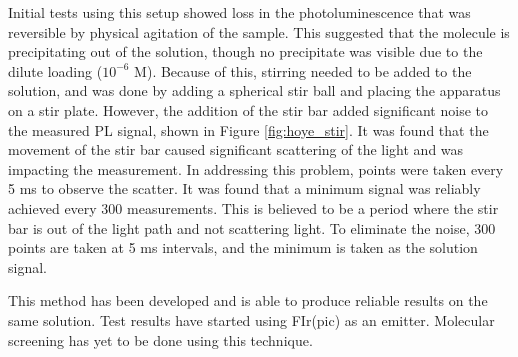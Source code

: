 \documentclass[../thesis.tex]{subfiles}
\begin{document}
Initial tests using this setup showed loss in the photoluminescence that was reversible by physical agitation of the sample.  
This suggested that the molecule is precipitating out of the solution, though no precipitate was visible due to the dilute loading ($10^{-6}$ M).
Because of this, stirring needed to be added to the solution, and was done by adding a spherical stir ball and placing the apparatus on a stir plate.
However, the addition of the stir bar added significant noise to the measured PL signal, shown in Figure \ref{fig:hoye_stir}.
It was found that the movement of the stir bar caused significant scattering of the light and was impacting the measurement.
In addressing this problem, points were taken every 5 ms to observe the scatter.
It was found that a minimum signal was reliably achieved every 300 measurements.
This is believed to be a period where the stir bar is out of the light path and not scattering light.  
To eliminate the noise, 300 points are taken at 5 ms intervals, and the minimum is taken as the solution signal.

This method has been developed and is able to produce reliable results on the same solution.
Test results have started using FIr(pic) as an emitter.
Molecular screening has yet to be done using this technique.
\end{document}
